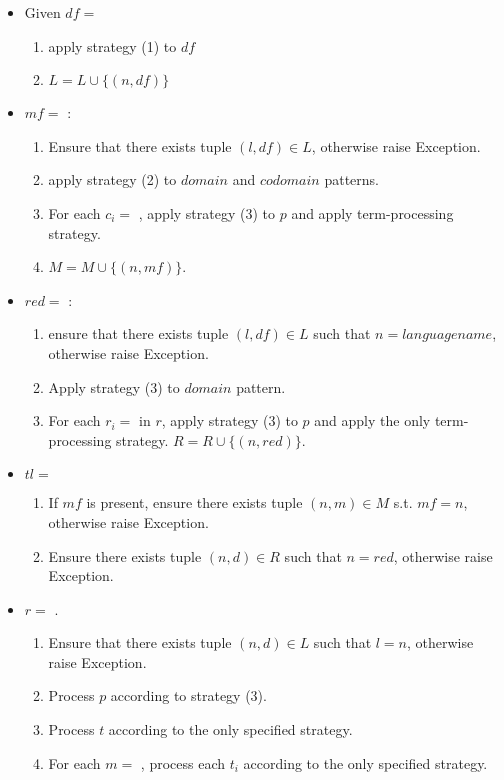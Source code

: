 \begin{itemize}
\item
Given $df=$\TlDefineLanguage 
	\begin{enumerate}
		\item apply strategy (1) to $df$ 
		\item $L = L \cup \{ (n, df) \}$
	\end{enumerate}

\item $mf=$ \TlDefineMetafunction: 
	\begin{enumerate}
	\item Ensure that there exists tuple $(l, df) \in L$, otherwise raise Exception.
	\item apply strategy (2) to $domain$ and $codomain$ patterns.
	\item For each $c_i=$ \MetafunctionCase, apply strategy (3) to $p$ and apply term-processing strategy. 
	\item $M = M \cup \{ (n, mf) \}$. 
	\end{enumerate}

\item $red=$ \TlDefineReductionRelation: 
\begin{enumerate}
\item ensure that there exists tuple $(l, df) \in L$ such that $n=languagename$, otherwise raise Exception.
\item Apply strategy (3) to $domain$ pattern. 
\item For each $r_i=$ \ReductionCase in $r$, apply strategy (3) to $p$ and apply the only term-processing strategy. $R = R \cup \{ (n, red) \}$.
\end{enumerate}

\item $tl=$ \ReadFromStdinAndApplyReductionRelation
\begin{enumerate} 
\item If $mf$ is present, ensure there exists tuple $(n, m) \in M$ s.t. $mf=n$, otherwise raise Exception.
\item Ensure there exists tuple $(n, d) \in R$ such that $n=red$, otherwise raise Exception.
\end{enumerate}


\item 
$r=$ \RedexMatchAssertEqual. 
	\begin{enumerate}
	\item Ensure that there exists tuple $(n, d) \in L$ such that $l=n$, otherwise raise Exception.
	\item Process $p$ according to strategy (3). 
	\item Process $t$ according to the only specified strategy.
	\item For each $m=$ \Match, process each $t_i$ according to the only specified strategy.
	\end{enumerate}


\end{itemize}
